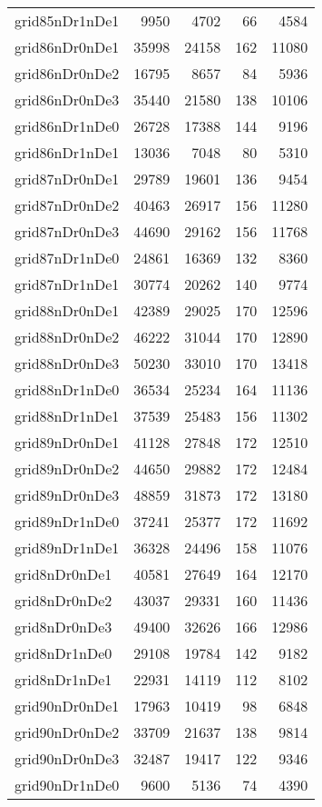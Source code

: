 \begin{longtable}{lrrrr}
grid85nDr1nDe1 & 9950 & 4702 & 66 & 4584 \\
grid86nDr0nDe1 & 35998 & 24158 & 162 & 11080 \\
grid86nDr0nDe2 & 16795 & 8657 & 84 & 5936 \\
grid86nDr0nDe3 & 35440 & 21580 & 138 & 10106 \\
grid86nDr1nDe0 & 26728 & 17388 & 144 & 9196 \\
grid86nDr1nDe1 & 13036 & 7048 & 80 & 5310 \\
grid87nDr0nDe1 & 29789 & 19601 & 136 & 9454 \\
grid87nDr0nDe2 & 40463 & 26917 & 156 & 11280 \\
grid87nDr0nDe3 & 44690 & 29162 & 156 & 11768 \\
grid87nDr1nDe0 & 24861 & 16369 & 132 & 8360 \\
grid87nDr1nDe1 & 30774 & 20262 & 140 & 9774 \\
grid88nDr0nDe1 & 42389 & 29025 & 170 & 12596 \\
grid88nDr0nDe2 & 46222 & 31044 & 170 & 12890 \\
grid88nDr0nDe3 & 50230 & 33010 & 170 & 13418 \\
grid88nDr1nDe0 & 36534 & 25234 & 164 & 11136 \\
grid88nDr1nDe1 & 37539 & 25483 & 156 & 11302 \\
grid89nDr0nDe1 & 41128 & 27848 & 172 & 12510 \\
grid89nDr0nDe2 & 44650 & 29882 & 172 & 12484 \\
grid89nDr0nDe3 & 48859 & 31873 & 172 & 13180 \\
grid89nDr1nDe0 & 37241 & 25377 & 172 & 11692 \\
grid89nDr1nDe1 & 36328 & 24496 & 158 & 11076 \\
grid8nDr0nDe1 & 40581 & 27649 & 164 & 12170 \\
grid8nDr0nDe2 & 43037 & 29331 & 160 & 11436 \\
grid8nDr0nDe3 & 49400 & 32626 & 166 & 12986 \\
grid8nDr1nDe0 & 29108 & 19784 & 142 & 9182 \\
grid8nDr1nDe1 & 22931 & 14119 & 112 & 8102 \\
grid90nDr0nDe1 & 17963 & 10419 & 98 & 6848 \\
grid90nDr0nDe2 & 33709 & 21637 & 138 & 9814 \\
grid90nDr0nDe3 & 32487 & 19417 & 122 & 9346 \\
grid90nDr1nDe0 & 9600 & 5136 & 74 & 4390 \\

\end{longtable}
